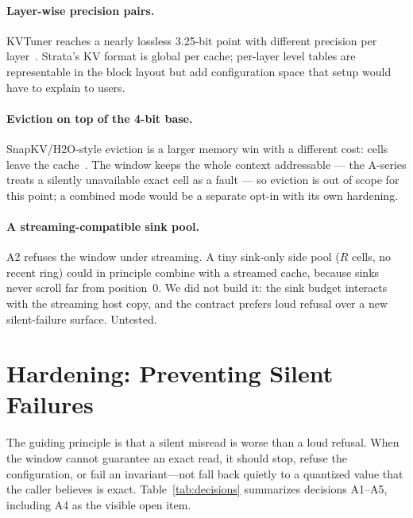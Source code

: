 \documentclass[10pt,twocolumn]{article}
\begin{document}
\paragraph{Layer-wise precision pairs.} KVTuner reaches a nearly lossless 3.25-bit point with different precision per layer~\cite{kvtuner}. Strata's KV format is global per cache; per-layer level tables are representable in the block layout but add configuration space that setup would have to explain to users.

\paragraph{Eviction on top of the 4-bit base.} SnapKV/H2O-style eviction is a larger memory win with a different cost: cells leave the cache~\cite{snapkv,h2o}. The window keeps the whole context addressable --- the A-series treats a silently unavailable exact cell as a fault --- so eviction is out of scope for this point; a combined mode would be a separate opt-in with its own hardening.

\paragraph{A streaming-compatible sink pool.} A2 refuses the window under streaming. A tiny sink-only side pool ($R$ cells, no recent ring) could in principle combine with a streamed cache, because sinks never scroll far from position~0. We did not build it: the sink budget interacts with the streaming host copy, and the contract prefers loud refusal over a new silent-failure surface. Untested.

\section{Hardening: Preventing Silent Failures}

The guiding principle is that a silent misread is worse than a loud refusal. When the window cannot guarantee an exact read, it should stop, refuse the configuration, or fail an invariant---not fall back quietly to a quantized value that the caller believes is exact. Table~\ref{tab:decisions} summarizes decisions A1--A5, including A4 as the visible open item.
\end{document}
